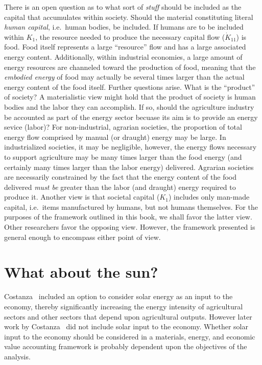There is an open
question as to what sort of \emph{stuff} 
should be included as the capital
that accumulates within society. 
Should the material constituting literal
\emph{human capital}, 
i.e.~human bodies, 
be included. 
If humans are to be included within $K_{1}$, 
the resource needed to produce the necessary capital
flow ($\dot{K}_{11}$) is food. 
Food itself represents a large ``resource''
flow and has a large associated energy content. 
Additionally, 
within industrial economies, 
a large amount of energy resources 
are channeled toward the production of food, 
meaning that the \emph{embodied energy}
of food may actually be several times larger than
the actual energy content of the food itself. 
Further questions arise. 
What is the ``product'' of society? 
A materialistic view might hold that the product of
society is human bodies and the labor they can accomplish. 
If so, 
should the agriculture industry 
be accounted as part of the energy sector 
becuase its aim is to provide 
an energy sevice (labor)? 
For non-industrial, agrarian societies, 
the proportion of total energy flow 
comprised by manual (or draught) energy 
may be large. 
In industrialized societies, 
it may be negligible, 
however, 
the energy flows necessary to support agriculture
may be many times larger than the food energy
(and certainly many times larger 
than the labor energy) 
delivered. 
Agrarian societies
are necessarily constrained by the fact that the energy content of the food delivered 
\emph{must be} greater than the labor (and draught) energy required to produce it.
Another view is that societal capital ($K_{1}$) includes only man-made capital, 
i.e.\ items manufactured by humans,
but not humans themselves. 
For the purposes of the framework outlined in this book, 
we shall favor the latter view.
Other researchers favor the opposing view.\cite{Giampietro2013}
However,
the framework presented is general enough to encompass either point of view.


\section{What about the sun?}
\label{sec:emergy}

Costanza~\cite{Costanza:1978vd} included an option to consider 
solar energy as an input to the economy, 
thereby significantly increasing the energy intensity 
of agricultural sectors and other sectors 
that depend upon agricultural outputs. 
However later work by Costanza~\cite{Costanza:1984tq,Costanza:1980ww} 
did not include solar input to the economy.
Whether solar input to the economy 
should be considered in a materials, energy, and economic value 
accounting framework is probably dependent upon 
the objectives of the analysis. 

